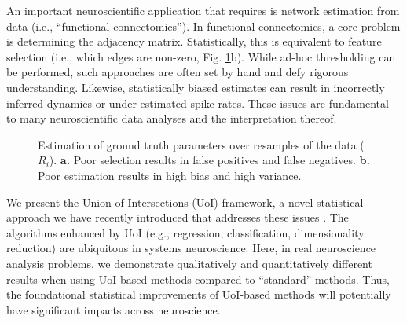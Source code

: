 \documentclass[letterpaper, 10 pt, conference]{ieeeconf}  %
\begin{document}
An important neuroscientific application that requires is network estimation from data (i.e., ``functional connectomics''). In functional connectomics, a core problem is determining the adjacency matrix. Statistically, this is equivalent to feature selection (i.e., which edges are non-zero, Fig.  \ref{fig:intro}b). While ad-hoc thresholding can be performed, such approaches are often set by hand and defy rigorous understanding. Likewise, statistically biased estimates can result in incorrectly inferred dynamics or under-estimated spike rates. These issues are fundamental to many neuroscientific data analyses and the interpretation thereof.

\begin{figure}[b!]
    \vspace{-15pt}
    \centering
    \vspace{-20pt}
    \caption{Estimation of ground truth parameters over resamples of the data ($R_i$). \textbf{a.} Poor selection results in false positives and false negatives. \textbf{b.} Poor estimation results in high bias and high variance.}
    \label{fig:intro}
\end{figure}

We present the Union of Intersections (UoI) framework, a novel statistical approach we have recently introduced that addresses these issues \cite{uoi}. The algorithms enhanced by UoI (e.g., regression, classification, dimensionality reduction) are ubiquitous in systems neuroscience. Here, in real neuroscience analysis problems, we demonstrate qualitatively and quantitatively different results when using UoI-based methods compared to ``standard'' methods.  Thus, the foundational statistical improvements of UoI-based methods will potentially have significant impacts across neuroscience.
\end{document}
